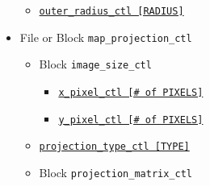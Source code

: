 \begin{itemize}
\begin{itemize}
			\item \hyperref[href_t:outer_radius_ctl]
					{\tt outer\_radius\_ctl     [RADIUS]}
		\end{itemize}
%
	\item File or Block \verb|map_projection_ctl|
				\label{href_i:map_projection_ctl}
		\begin{itemize}
    			\item Block \verb|image_size_ctl|
						\label{href_i:image_size_ctl}
				\begin{itemize}
					\item \hyperref[href_t:x_pixel_ctl]
							{\tt x\_pixel\_ctl   [\# of PIXELS]}
					\item \hyperref[href_t:y_pixel_ctl]
							{\tt y\_pixel\_ctl   [\# of PIXELS]}
				\end{itemize}
%
%
			\item \hyperref[href_t:projection_type_ctl]
					{\tt projection\_type\_ctl   [TYPE]}
%
   			\item Block \verb|projection_matrix_ctl|
						\label{href_i:projection_matrix_ctl}
				\begin{itemize}

\end{itemize}
\end{itemize}
\end{itemize}
